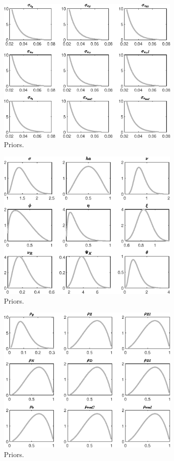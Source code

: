 
\begin{figure}[H]
\centering
\includegraphics[width=0.80\textwidth]{BRS_sectoral_wo_vcu/graphs/BRS_sectoral_wo_vcu_Priors1}
\caption{Priors.}\label{Fig:Priors:1}
\end{figure}
\begin{figure}[H]
\centering
\includegraphics[width=0.80\textwidth]{BRS_sectoral_wo_vcu/graphs/BRS_sectoral_wo_vcu_Priors2}
\caption{Priors.}\label{Fig:Priors:2}
\end{figure}
\begin{figure}[H]
\centering
\includegraphics[width=0.80\textwidth]{BRS_sectoral_wo_vcu/graphs/BRS_sectoral_wo_vcu_Priors3}
\caption{Priors.}\label{Fig:Priors:3}
\end{figure}
 
